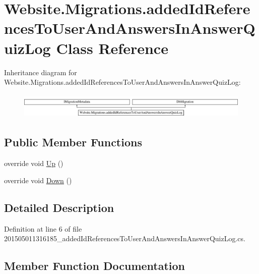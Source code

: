 \hypertarget{class_website_1_1_migrations_1_1added_id_references_to_user_and_answers_in_answer_quiz_log}{}\section{Website.\+Migrations.\+added\+Id\+References\+To\+User\+And\+Answers\+In\+Answer\+Quiz\+Log Class Reference}
\label{class_website_1_1_migrations_1_1added_id_references_to_user_and_answers_in_answer_quiz_log}
Inheritance diagram for Website.\+Migrations.\+added\+Id\+References\+To\+User\+And\+Answers\+In\+Answer\+Quiz\+Log\+:\begin{figure}[H]
\begin{center}
\leavevmode
\includegraphics[height=1.236203cm]{class_website_1_1_migrations_1_1added_id_references_to_user_and_answers_in_answer_quiz_log}
\end{center}
\end{figure}
\subsection*{Public Member Functions}
\begin{DoxyCompactItemize}
\item 
override void \hyperlink{class_website_1_1_migrations_1_1added_id_references_to_user_and_answers_in_answer_quiz_log_aa25a368c1637b356fb4e2865e00c24c5}{Up} ()
\item 
override void \hyperlink{class_website_1_1_migrations_1_1added_id_references_to_user_and_answers_in_answer_quiz_log_a05088bb8a73dce9511bac7034095eb9e}{Down} ()
\end{DoxyCompactItemize}


\subsection{Detailed Description}


Definition at line 6 of file 201505011316185\+\_\+added\+Id\+References\+To\+User\+And\+Answers\+In\+Answer\+Quiz\+Log.\+cs.



\subsection{Member Function Documentation}
\hypertarget{class_website_1_1_migrations_1_1added_id_references_to_user_and_answers_in_answer_quiz_log_a05088bb8a73dce9511bac7034095eb9e}{}
